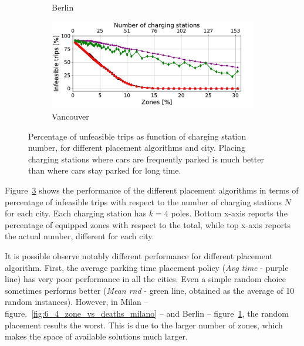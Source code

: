 \begin{figure}[t!]
\begin{center}
\begin{subfigure}{0.49\textwidth}
			\caption{Berlin}
			\label{fig:6_4_zone_vs_deaths_berlino}
		\end{subfigure}
		\begin{subfigure}{0.49\textwidth}
			\includegraphics[width=\columnwidth]{figures/Vancouver_zonesVsDeaths_algorithms_acs-4_tt-25_policy-FreeFloating.pdf}
			\caption{Vancouver}
			\label{fig:6_4_zone_vs_deaths_vancouver}
		\end{subfigure}         
		\caption{Percentage of unfeasible trips as function of charging station number, for different placement algorithms and city. Placing charging stations where cars are frequently parked is much better than where cars stay parked for long time.}
		\label{fig:6_4_deathsVsZones_algorithm}
	\end{center}
\end{figure}


Figure~\ref{fig:6_4_deathsVsZones_algorithm} shows the performance of the different placement algorithms in terms of percentage of infeasible trips  with respect to  the number of charging stations $N$ for each city. Each charging station has $k=4$ poles. Bottom x-axis reports the percentage of equipped zones with respect to the total, while top x-axis reports the actual number, different for each city.

It is possible observe notably different performance for different placement algorithm. First, the average parking time placement policy (\textit{Avg time} - purple line) has very poor performance in all the cities. Even a simple random choice sometimes performs better (\textit{Mean rnd} - green line, obtained as the average of 10 random instances). However, in Milan -- figure.~\ref{fig:6_4_zone_vs_deaths_milano} -- and Berlin -- figure~\ref{fig:6_4_zone_vs_deaths_berlino}, the random placement results the worst. This is due to the larger number of zones, which makes the space of available solutions much larger.

